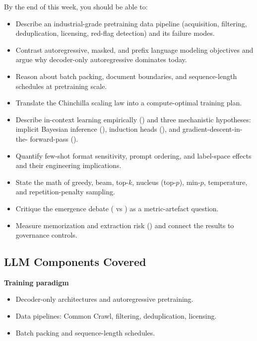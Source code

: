 By the end of this week, you should be able to:
\begin{itemize}
  \item Describe an industrial-grade pretraining data pipeline
        (acquisition, filtering, deduplication, licensing, red-flag
        detection) and its failure modes.
  \item Contrast autoregressive, masked, and prefix language modeling
        objectives and argue why decoder-only autoregressive
        dominates today.
  \item Reason about batch packing, document boundaries, and
        sequence-length schedules at pretraining scale.
  \item Translate the Chinchilla scaling law into a compute-optimal
        training plan.
  \item Describe in-context learning empirically
        (\citealt{brown2020language}) and three mechanistic
        hypotheses: implicit Bayesian inference
        (\citealt{xie2022explanation}), induction heads
        (\citealt{olsson2022induction}), and gradient-descent-in-the-
        forward-pass (\citealt{vonoswald2023transformers}).
  \item Quantify few-shot format sensitivity, prompt ordering, and
        label-space effects and their engineering implications.
  \item State the math of greedy, beam, top-$k$, nucleus (top-$p$),
        min-$p$, temperature, and repetition-penalty sampling.
  \item Critique the emergence debate (\citealt{wei2022emergent} vs
        \citealt{schaeffer2023mirage}) as a metric-artefact question.
  \item Measure memorization and extraction risk
        (\citealt{carlini2021extracting,carlini2023quantifying}) and
        connect the results to governance controls.
\end{itemize}

\subsection{LLM Components Covered}

\textbf{Training paradigm}
\begin{itemize}
  \item Decoder-only architectures and autoregressive pretraining.
  \item Data pipelines: Common Crawl, filtering, deduplication,
        licensing.
  \item Batch packing and sequence-length schedules.
\end{itemize}


